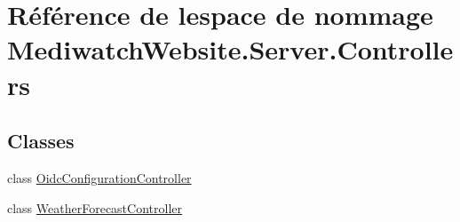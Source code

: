\hypertarget{namespace_mediwatch_website_1_1_server_1_1_controllers}{}\section{Référence de l\textquotesingle{}espace de nommage Mediwatch\+Website.\+Server.\+Controllers}
\label{namespace_mediwatch_website_1_1_server_1_1_controllers}
\subsection*{Classes}
\begin{DoxyCompactItemize}
\item 
class \hyperlink{class_mediwatch_website_1_1_server_1_1_controllers_1_1_oidc_configuration_controller}{Oidc\+Configuration\+Controller}
\item 
class \hyperlink{class_mediwatch_website_1_1_server_1_1_controllers_1_1_weather_forecast_controller}{Weather\+Forecast\+Controller}
\end{DoxyCompactItemize}
